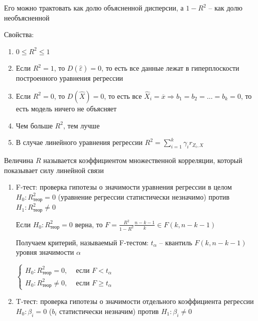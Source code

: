 \begin{enumerate}
    Его можно трактовать как долю объясненной дисперсии, а $1 - R^2$ -- как долю необъясненной

    Свойства:

    \begin{enumerate}
        \item $0 \leq R^2 \leq 1$
        \item Если $R^2 = 1$, то $D(\hat \varepsilon) = 0$, то есть все данные лежат в гиперплоскости построенного уравнения регрессии
        \item Если $R^2 = 0$, то $D(\hat X) = 0$, то есть все $\hat X_i = \overline{x} \Longrightarrow b_1 = b_2 = \dots = b_k = 0$, то есть модель ничего не объясняет
        \item Чем больше $R^2$, тем лучше
        \item В случае линейного уравнения регрессии $R^2 = \sum_{i = 1}^k \gamma_i r_{Z_i, X}$
    \end{enumerate}

    \Def Величина $R$ называется коэффициентом множественной корреляции, который показывает силу линейной связи

    \begin{enumerate}[label*=\asbuk*) ]
        \item F-тест: проверка гипотезы о значимости уравнения регрессии в целом 
        $H_0 : R^2_\text{теор} = 0 $ (уравнение регрессии статистически незначимо) против $H_1 : R^2_\text{теор} \neq 0$

        \begin{MyTheorem}
            \Ths Если $H_0 : R^2_\text{теор} = 0$ верна, то $F = \frac{R^2}{1 - R^2} \frac{n - k - 1}{k} \in F(k, n - k - 1)$
        \end{MyTheorem}

        Получаем критерий, называемый F-тестом: $t_\alpha$ -- квантиль $F(k, n - k - 1)$ уровня значимости $\alpha$

        $\begin{cases}
            H_0 : R^2_\text{теор} = 0, & \text{ если } F < t_\alpha \\ 
            H_0 : R^2_\text{теор} \neq 0, & \text{ если } F \geq t_\alpha
        \end{cases}$

        \item T-тест: проверка гипотезы о значимости отдельного коэффициента регрессии 
        $H_0 : \beta_i = 0$ ($b_i$ статистически незначим) против $H_1 : \beta_i \neq 0$


\end{enumerate}
\end{enumerate}

